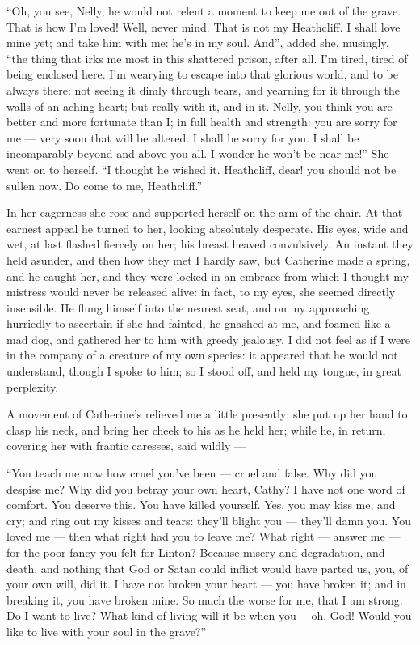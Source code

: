 \par “Oh, you see, Nelly, he would not relent a moment to keep me out of the grave. That is how I'm loved! Well, never mind. That is not my Heathcliff. I shall love mine yet; and take him with me: he's in my soul. And”, added she, musingly, “the thing that irks me most in this shattered prison, after all. I'm tired, tired of being enclosed here. I'm wearying to escape into that glorious world, and to be always there: not seeing it dimly through tears, and yearning for it through the walls of an aching heart; but really with it, and in it. Nelly, you think you are better and more fortunate than I; in full health and strength: you are sorry for me — very soon that will be altered. I shall be sorry for you. I shall be incomparably beyond and above you all. I wonder he won't be near me!” She went on to herself. “I thought he wished it. Heathcliff, dear! you should not be sullen now. Do come to me, Heathcliff.”
\par In her eagerness she rose and supported herself on the arm of the chair. At that earnest appeal he turned to her, looking absolutely desperate. His eyes, wide and wet, at last flashed fiercely on her; his breast heaved convulsively. An instant they held asunder, and then how they met I hardly saw, but Catherine made a spring, and he caught her, and they were locked in an embrace from which I thought my mistress would never be released alive: in fact, to my eyes, she seemed directly insensible. He flung himself into the nearest seat, and on my approaching hurriedly to ascertain if she had fainted, he gnashed at me, and foamed like a mad dog, and gathered her to him with greedy jealousy. I did not feel as if I were in the company of a creature of my own species: it appeared that he would not understand, though I spoke to him; so I stood off, and held my tongue, in great perplexity.
\par A movement of Catherine's relieved me a little presently: she put up her hand to clasp his neck, and bring her cheek to his as he held her; while he, in return, covering her with frantic caresses, said wildly —
\par “You teach me now how cruel you've been — cruel and false. Why did you despise me? Why did you betray your own heart, Cathy? I have not one word of comfort. You deserve this. You have killed yourself. Yes, you may kiss me, and cry; and ring out my kisses and tears: they'll blight you — they'll damn you. You loved me — then what right had you to leave me? What right — answer me — for the poor fancy you felt for Linton? Because misery and degradation, and death, and nothing that God or Satan could inflict would have parted us, you, of your own will, did it. I have not broken your heart — you have broken it; and in breaking it, you have broken mine. So much the worse for me, that I am strong. Do I want to live? What kind of living will it be when you —oh, God! Would you like to live with your soul in the grave?”

